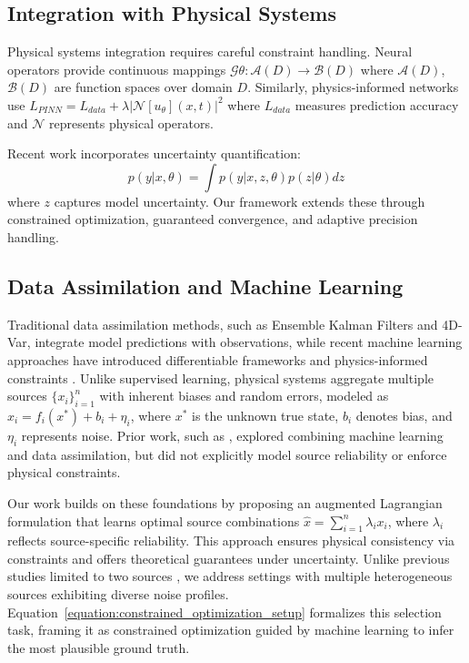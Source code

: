\documentclass[preprint,12pt,authoryear]{elsarticle}
\begin{document}
\subsection{Integration with Physical Systems}
Physical systems integration requires careful constraint handling. Neural operators provide continuous mappings $\mathcal{G}\theta: \mathcal{A}(D) \rightarrow \mathcal{B}(D)$ where $\mathcal{A}(D)$, $\mathcal{B}(D)$ are function spaces over domain $D$. Similarly, physics-informed networks use $L_{PINN} = L_{data} + \lambda |\mathcal{N}[u_\theta](x,t)|^2$ where $L_{data}$ measures prediction accuracy and $\mathcal{N}$ represents physical operators.

Recent work \cite{yang2021b} incorporates uncertainty quantification:
\begin{equation}
p(y|x,\theta) = \int p(y|x,z,\theta)p(z|\theta)dz
\end{equation}
where $z$ captures model uncertainty. Our framework extends these through constrained optimization, guaranteed convergence, and adaptive precision handling.



\subsection{Data Assimilation and Machine Learning}
Traditional data assimilation methods, such as Ensemble Kalman Filters \cite{evensen2003ensemble} and 4D-Var, integrate model predictions with observations, while recent machine learning approaches have introduced differentiable frameworks \cite{reich2023data} and physics-informed constraints \cite{karniadakis2021physics}. Unlike supervised learning, physical systems aggregate multiple sources $\{x_i\}_{i=1}^n$ with inherent biases and random errors, modeled as $x_i = f_i(x^*) + b_i + \eta_i$, where $x^*$ is the unknown true state, $b_i$ denotes bias, and $\eta_i$ represents noise. Prior work, such as \cite{brajard2021combining, pokhrel2024machine}, explored combining machine learning and data assimilation, but did not explicitly model source reliability or enforce physical constraints.

Our work builds on these foundations by proposing an augmented Lagrangian formulation that learns optimal source combinations $\hat{x} = \sum_{i=1}^n \lambda_i x_i$, where $\lambda_i$ reflects source-specific reliability. This approach ensures physical consistency via constraints and offers theoretical guarantees under uncertainty. Unlike previous studies limited to two sources \cite{schmidt2024algorithm, schmidt2024forecasting}, we address settings with multiple heterogeneous sources exhibiting diverse noise profiles. Equation~\ref{equation:constrained_optimization_setup} formalizes this selection task, framing it as constrained optimization guided by machine learning to infer the most plausible ground truth.
\end{document}
